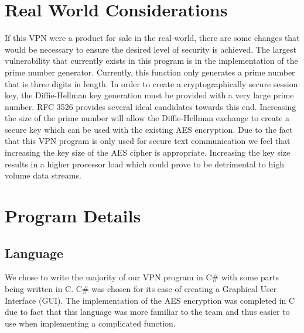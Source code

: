 \documentclass[journal]{IEEEtran}
\begin{document}

\section{Real World Considerations}
If this VPN were a product for sale in the real-world, there are some changes that would be necessary to ensure the desired level of security is achieved. The largest vulnerability that currently exists in this program is in the implementation of the prime number generator. Currently, this function only generates a prime number that is three digits in length. In order to create a cryptographically secure session key, the Diffie-Hellman key generation must be provided with a very large prime number. RFC 3526 provides several ideal candidates towards this end\cite{RFC3526}. Increasing the size of the prime number will allow the Diffie-Hellman exchange to create a secure key which can be used with the existing AES encryption. Due to the fact that this VPN program is only used for secure text communication we feel that increasing the key size of the AES cipher is appropriate. Increasing the key size results in a higher processor load which could prove to be detrimental to high volume data streams. 

\section{Program Details}
\subsection*{Language}
We chose to write the majority of our VPN program in C\# with some parts being written in C. C\# was chosen for its ease of creating a Graphical User Interface (GUI). The implementation of the AES encryption was completed in C due to fact that this language was more familiar to the team and thus easier to use when implementing a complicated function. 
\end{document}
